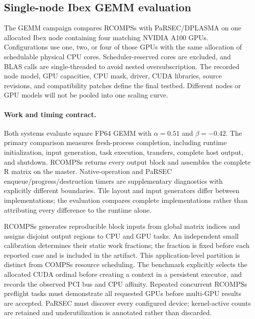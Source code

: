 \subsection{Single-node Ibex GEMM evaluation}
\label{sec:ibex-gemm}
The GEMM campaign compares RCOMPSs with PaRSEC/DPLASMA on one allocated Ibex node containing four matching NVIDIA A100 GPUs. Configurations use one, two, or four of those GPUs with the same allocation of schedulable physical CPU cores. Scheduler-reserved cores are excluded, and BLAS calls are single-threaded to avoid nested oversubscription. The recorded node model, GPU capacities, CPU mask, driver, CUDA libraries, source revisions, and compatibility patches define the final testbed. Different nodes or GPU models will not be pooled into one scaling curve.

\paragraph{Work and timing contract.}
Both systems evaluate square FP64 GEMM with $\alpha=0.51$ and $\beta=-0.42$. The primary comparison measures fresh-process completion, including runtime initialization, input generation, task execution, transfers, complete host output, and shutdown. RCOMPSs returns every output block and assembles the complete R matrix on the master. Native-operation and PaRSEC enqueue/progress/destruction timers are supplementary diagnostics with explicitly different boundaries. Tile layout and input generators differ between implementations; the evaluation compares complete implementations rather than attributing every difference to the runtime alone.

RCOMPSs generates reproducible block inputs from global matrix indices and assigns disjoint output regions to CPU and GPU tasks. An independent small calibration determines their static work fractions; the fraction is fixed before each reported case and is included in the artifact. This application-level partition is distinct from COMPSs resource scheduling. The benchmark explicitly selects the allocated CUDA ordinal before creating a context in a persistent executor, and records the observed PCI bus and CPU affinity. Repeated concurrent RCOMPSs preflight tasks must demonstrate all requested GPUs before multi-GPU results are accepted. PaRSEC must discover every configured device; kernel-active counts are retained and underutilization is annotated rather than discarded.

